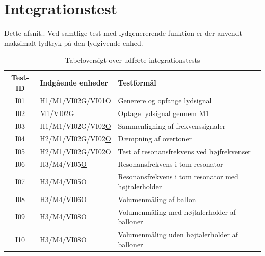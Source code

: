 \section{Integrationstest}

Dette afsnit..
Ved samtlige test med lydgenererende funktion er der anvendt maksimalt lydtryk på den lydgivende enhed.
			
\begin{table}[htb]
				\centering
				\caption{Tabeloversigt over udførte integrationstests} 
				\label{integrationstest}
				\begin{tabular}{cll}
					\multicolumn{1}{c|}{\textbf{Test-ID}} &
					\multicolumn{1}{l|}{\textbf{Indgående enheder}} & 	  \textbf{Testformål} \\ \hline
					\multicolumn{1}{c|}{I01} &
					\multicolumn{1}{l|}{H1/M1/VI02G/VI01\underline{O}}&Generere og opfange lydsignal\\	
					
					\multicolumn{1}{c|}{I02} &
					\multicolumn{1}{l|}{M1/VI02G}&Optage lydsignal gennem M1\\	
					
					\multicolumn{1}{c|}{I03} &
					\multicolumn{1}{l|}{H1/M1/VI02G/VI02\underline{O}}&Sammenligning af frekvenssignaler\\
					
					\multicolumn{1}{c|}{I04} &
					\multicolumn{1}{l|}{H2/M1/VI02G/VI02\underline{O}}&Dæmpning af overtoner\\
					
					\multicolumn{1}{c|}{I05} &
					\multicolumn{1}{l|}{H2/M1/VI02G/VI02\underline{O}}&Test af resonansfrekvens ved højfrekvenser\\	
					
					\multicolumn{1}{c|}{I06} &
					\multicolumn{1}{l|}{H3/M4/VI05\underline{O}}&Resonansfrekvens i tom resonator\\
					
					\multicolumn{1}{c|}{I07} &
					\multicolumn{1}{l|}{H3/M4/VI05\underline{O}}&Resonansfrekvens i tom resonator med højtalerholder\\	
					
					\multicolumn{1}{c|}{I08} &
					\multicolumn{1}{l|}{H3/M4/VI06\underline{O}}&Volumenmåling af ballon\\
					
					\multicolumn{1}{c|}{I09} &
					\multicolumn{1}{l|}{H3/M4/VI08\underline{O}}&Volumenmåling med højtalerholder af balloner\\	
					
					\multicolumn{1}{c|}{I10} &
					\multicolumn{1}{l|}{H3/M4/VI08\underline{O}}&Volumenmåling uden højtalerholder af balloner\\	
						
				\end{tabular}
			\end{table}
	



